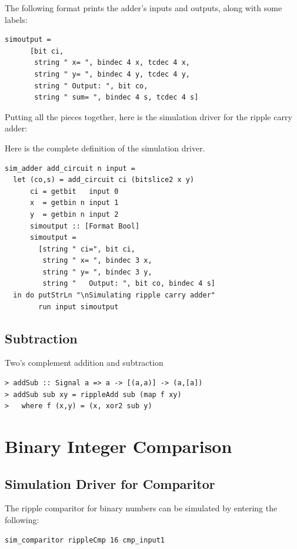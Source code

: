 \documentclass[a4paper,openany,fleqn]{book}
\begin{document}
The following format prints the adder's inputs and outputs, along with
some labels:

\begin{verbatim}
simoutput =
      [bit ci,
       string " x= ", bindec 4 x, tcdec 4 x,
       string " y= ", bindec 4 y, tcdec 4 y,
       string " Output: ", bit co,
       string " sum= ", bindec 4 s, tcdec 4 s]
\end{verbatim}

Putting all the pieces together, here is the simulation driver for the
ripple carry adder:

Here is the complete definition of the simulation driver.

\begin{verbatim}
sim_adder add_circuit n input =
  let (co,s) = add_circuit ci (bitslice2 x y)
      ci = getbit   input 0
      x  = getbin n input 1
      y  = getbin n input 2
      simoutput :: [Format Bool]
      simoutput =
        [string " ci=", bit ci,
         string " x= ", bindec 3 x,
         string " y= ", bindec 3 y,
         string "   Output: ", bit co, bindec 4 s]
  in do putStrLn "\nSimulating ripple carry adder"
        run input simoutput
\end{verbatim}

\subsection{Subtraction}
\label{sec:subtraction}

Two's complement addition and subtraction

\begin{verbatim}
> addSub :: Signal a => a -> [(a,a)] -> (a,[a])
> addSub sub xy = rippleAdd sub (map f xy)
>   where f (x,y) = (x, xor2 sub y)
\end{verbatim}


\section{Binary Integer Comparison}
\label{sec:binary-integer-comparison}

\subsection{Simulation Driver for Comparitor}
\label{sec:sim-driver-comp}


The ripple comparitor for binary numbers can be simulated by entering
the following:

\begin{verbatim}
sim_comparitor rippleCmp 16 cmp_input1
\end{verbatim}
\end{document}
